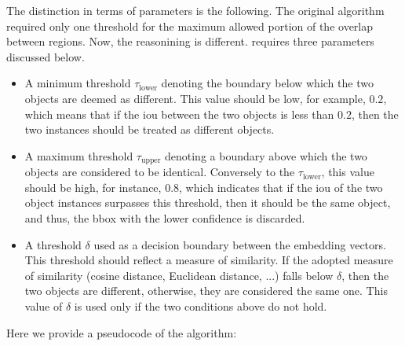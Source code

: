 \def\threshlower{\tau_{\text{lower}}}
\def\threshupper{\tau_{\text{upper}}}
\def\threshsim{\delta}

The distinction in terms of parameters is the following. The original algorithm required only one threshold for the maximum allowed portion of the overlap between regions. Now, the reasonining is different. \featurenms{} requires three parameters discussed below.
\begin{itemize}
    \item A minimum threshold $\threshlower$ denoting the boundary below which the two objects are deemed as different. This value should be low, for example, $0.2$, which means that if the \gls{iou} between the two objects is less than $0.2$, then the two instances should be treated as different objects.
    \item A maximum threshold $\threshupper$ denoting a boundary above which the two objects are considered to be identical. Conversely to the $\threshlower$, this value should be high, for instance, $0.8$, which indicates that if the \gls{iou} of the two object instances surpasses this threshold, then it should be the same object, and thus, the \gls{bbox} with the lower confidence is discarded.
    \item A threshold $\threshsim$ used as a decision boundary between the embedding vectors. This threshold should reflect a measure of similarity. If the adopted measure of similarity (cosine distance, Euclidean distance, ...) falls below $\threshsim$, then the two objects are different, otherwise, they are considered the same one. This value of $\threshsim$ is used only if the two conditions above do not hold.
\end{itemize}

Here we provide a pseudocode of the \featurenms{} algorithm:

